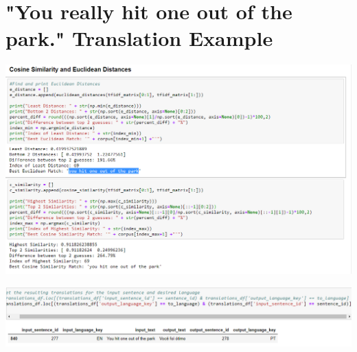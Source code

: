 \documentclass[runningheads]{llncs}
\begin{document}
\section{"You really hit one out of the park." Translation Example}
\hypertarget{Appendix G}{}
	\begin{minipage}{\linewidth}
		\begin{center}
			\includegraphics[width=\linewidth]{Park_Comparison.png}
			\label{fig:Sentence Comparison 4}
			\vspace*{1cm}
		\end{center}
	\end{minipage}
	\afterpage{\clearpage}
	\begin{minipage}{\linewidth}
		\begin{center}
			\includegraphics[width=\linewidth]{Park_Translation.png}
			\label{fig:Translation for Colloquialism}
			\vspace*{1cm}
		\end{center}
	\end{minipage}
	\afterpage{\clearpage}
\end{document}
